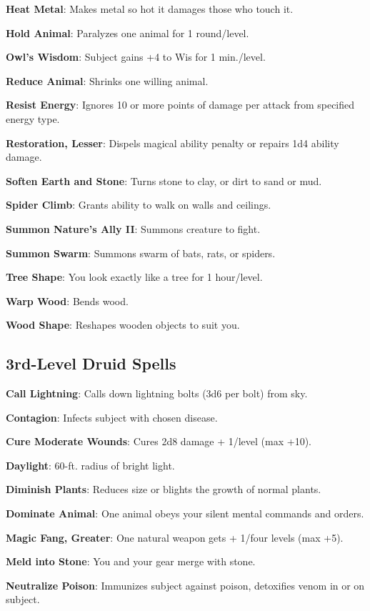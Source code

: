 \textbf{Heat Metal}: Makes metal so hot it damages those who touch it.

\textbf{Hold Animal}: Paralyzes one animal for 1 round/level.

\textbf{Owl's Wisdom}: Subject gains +4 to Wis for 1 min./level.

\textbf{Reduce Animal}: Shrinks one willing animal.

\textbf{Resist Energy}: Ignores 10 or more points of damage per attack from specified energy type.

\textbf{Restoration, Lesser}: Dispels magical ability penalty or repairs 1d4 ability damage.

\textbf{Soften Earth and Stone}: Turns stone to clay, or dirt to sand or mud.

\textbf{Spider Climb}: Grants ability to walk on walls and ceilings.

\textbf{Summon Nature's Ally II}: Summons creature to fight.

\textbf{Summon Swarm}: Summons swarm of bats, rats, or spiders.

\textbf{Tree Shape}: You look exactly like a tree for 1 hour/level.

\textbf{Warp Wood}: Bends wood.

\textbf{Wood Shape}: Reshapes wooden objects to suit you.

\subsection{3rd-Level Druid Spells}


\textbf{Call Lightning}: Calls down lightning bolts (3d6 per bolt) from sky.

\textbf{Contagion}: Infects subject with chosen disease.

\textbf{Cure Moderate Wounds}: Cures 2d8 damage + 1/level (max +10).

\textbf{Daylight}: 60-ft. radius of bright light.

\textbf{Diminish Plants}: Reduces size or blights the growth of normal plants.

\textbf{Dominate Animal}: One animal obeys your silent mental commands and orders.

\textbf{Magic Fang, Greater}: One natural weapon gets + 1/four levels (max +5).

\textbf{Meld into Stone}: You and your gear merge with stone.

\textbf{Neutralize Poison}: Immunizes subject against poison, detoxifies venom in or on subject.

